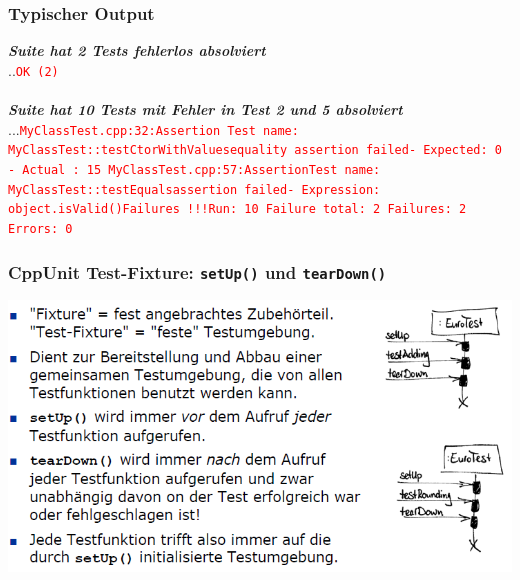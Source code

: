 \begin{multicols}{2}
\subsubsection{Typischer Output}
\footnotesize{
	\textbf{\textit{Suite hat 2 Tests fehlerlos absolviert}}\\
	..\newline \textcolor{red}{\texttt{OK (2)}}\\\\
	\textbf{\textit{Suite hat 10 Tests mit Fehler in Test 2 und 5 absolviert}} \\ 
	...\newline \textcolor{red}{\texttt{MyClassTest.cpp:32:Assertion \newline Test name: MyClassTest::testCtorWithValues\newline equality assertion failed\newline - Expected: 0 \newline - Actual : 15 \newline \newline MyClassTest.cpp:57:Assertion\newline Test name: MyClassTest::testEquals\newline assertion failed\newline - Expression: object.isValid()\newline \newline Failures !!!\newline Run: 10 \qquad Failure total: 2 \qquad Failures: 2 \qquad Errors: 0}}}
\subsubsection{CppUnit Test-Fixture: \texttt{setUp()} und \texttt{tearDown()}}
\includegraphics[width = 8 cm]{images/fixture}
\end{multicols}